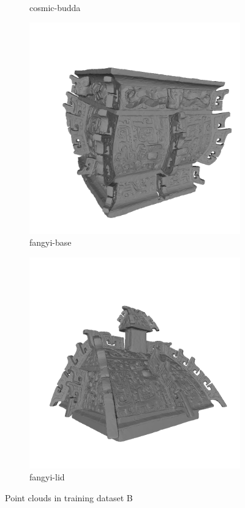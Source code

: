 \begin{figure}[!h]
\begin{subfigure}[b]{0.23\linewidth}
		\caption{cosmic-budda}
	\end{subfigure}
	\begin{subfigure}[b]{0.23\linewidth}
		\includegraphics[width=\linewidth]{./Figures/train-dataset/46.fangyi-base.png}
		\caption{fangyi-base}
	\end{subfigure}
	\begin{subfigure}[b]{0.23\linewidth}
		\includegraphics[width=\linewidth]{./Figures/train-dataset/47.fangyi-lid.png}
		\caption{fangyi-lid}
	\end{subfigure}

	
	\label{fig:dataset_b}
	\caption{Point clouds in training dataset B}
\end{figure}


